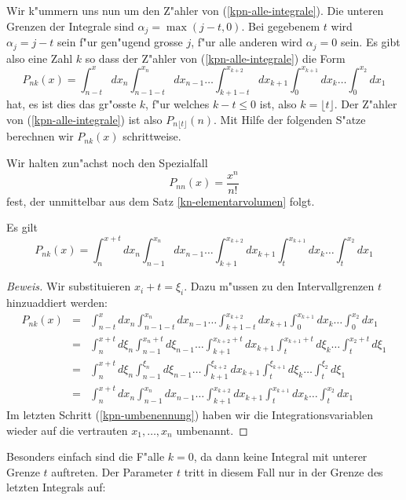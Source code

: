 Wir k"ummern uns nun um den Z"ahler von (\ref{kpn-alle-integrale}).
Die unteren Grenzen der
Integrale sind $\alpha_j=\max(j-t,0)$. Bei gegebenem $t$ wird $\alpha_j=j-t$
sein f"ur gen"ugend grosse $j$, f"ur alle anderen wird $\alpha_j=0$ sein.
Es gibt also eine Zahl $k$ so dass der Z"ahler von (\ref{kpn-alle-integrale})
die Form
$$P_{nk}(x)=\int_{n-t}^xdx_n\int_{n-1-t}^{x_n}dx_{n-1}\dots\int_{k+1-t}^{x_{k+2}}dx_{k+1}\int_0^{x_{k+1}}dx_k\dots\int_0^{x_2}dx_1$$
hat, es ist dies das gr"osste $k$, f"ur welches $k-t\le 0$ ist, also
$k=\lfloor t\rfloor$. Der Z"ahler von (\ref{kpn-alle-integrale})
ist also $P_{n\lfloor t\rfloor}(n)$.
Mit Hilfe der folgenden S"atze berechnen wir $P_{nk}(x)$ schrittweise.

Wir halten zun"achst noch den Spezialfall
\begin{equation}
P_{nn}(x)=\frac{x^n}{n!}
\label{spezialfall-pnn}
\end{equation}
fest, der unmittelbar aus dem Satz \ref{kn-elementarvolumen} folgt.

\begin{satz}
\label{kn-variablentransformation}
Es gilt
\begin{equation}
P_{nk}(x)=\int_{n}^{x+t}dx_n\int_{n-1}^{x_n}dx_{n-1}\dots\int_{k+1}^{x_{k+2}}dx_{k+1}\int_t^{x_{k+1}}dx_k\dots\int_t^{x_2}dx_1
\label{kpn-variablen-transformation}
\end{equation}
\end{satz}
\begin{proof}[Beweis]
Wir substituieren $x_i+t=\xi_i$. Dazu m"ussen zu den Intervallgrenzen
$t$ hinzuaddiert werden:
\begin{eqnarray}
P_{nk}(x)
&=&\int_{n-t}^xdx_n\int_{n-1-t}^{x_n}dx_{n-1}\dots\int_{k+1-t}^{x_{k+2}}dx_{k+1}\int_0^{x_{k+1}}dx_k\dots\int_0^{x_2}dx_1\nonumber\\
&=&\int_{n}^{x+t}d\xi_n\int_{n-1}^{x_n+t}d\xi_{n-1}\dots\int_{k+1}^{x_{k+2}+t}dx_{k+1}\int_t^{x_{k+1}+t}d\xi_k\dots\int_t^{x_2+t}d\xi_1\nonumber\\
&=&\int_{n}^{x+t}d\xi_n\int_{n-1}^{\xi_n}d\xi_{n-1}\dots\int_{k+1}^{\xi_{k+2}}dx_{k+1}\int_t^{\xi_{k+1}}d\xi_k\dots\int_t^{\xi_2}d\xi_1\nonumber\\
&=&\int_{n}^{x+t}dx_n\int_{n-1}^{x_n}dx_{n-1}\dots\int_{k+1}^{x_{k+2}}dx_{k+1}\int_t^{x_{k+1}}dx_k\dots\int_t^{x_2}dx_1 \label{kpn-umbenennung}
\end{eqnarray}
Im letzten Schritt (\ref{kpn-umbenennung}) haben wir die Integrationsvariablen
wieder auf die vertrauten $x_1,\dots,x_n$ umbenannt.
\end{proof}
Besonders einfach sind die F"alle $k=0$, da dann keine Integral mit
unterer Grenze $t$ auftreten. Der Parameter $t$ tritt in diesem Fall nur
in der Grenze des letzten Integrals auf:

